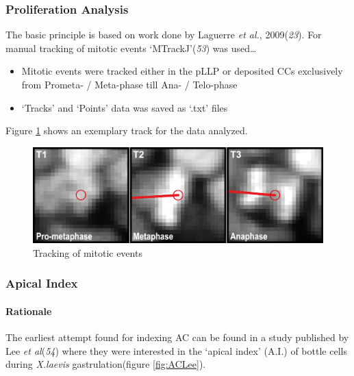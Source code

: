 \documentclass[11pt,singlespacinge,twoside]{reedthesis} %
\providecommand{\tightlist}{%
  \setlength{\itemsep}{0pt}\setlength{\parskip}{0pt}}
\begin{document}
\hypertarget{prolif}{%
\subsubsection{Proliferation Analysis}\label{prolif}}

The basic principle is based on work done by Laguerre \emph{et al.}, 2009(\emph{23}). For manual tracking of mitotic events `MTrackJ'(\emph{53}) was used\ldots{}
\begin{itemize}
\tightlist
\item
  Mitotic events were tracked either in the pLLP or deposited CCs exclusively from Prometa- / Meta-phase till Ana- / Telo-phase
\item
  `Tracks' and `Points' data was saved as `.txt' files
\end{itemize}
\noindent Figure \ref{fig:mitodatapoints} shows an exemplary track for the data analyzed.


\begin{figure}

{\centering \includegraphics[width=0.5\linewidth]{figure/02-MaMo/Prol/Prolif} 

}

\caption{Tracking of mitotic events}\label{fig:mitodatapoints}
\end{figure}
\hypertarget{ACI}{%
\subsubsection{Apical Index}\label{ACI}}

\hypertarget{rationale}{%
\paragraph{Rationale}\label{rationale}}

The earliest attempt found for indexing AC can be found in a study published by Lee \emph{et al}(\emph{54}) where they were interested in the `apical index' (A.I.) of bottle cells during \emph{X.laevis} gastrulation(figure \ref{fig:ACLee}).
\end{document}
